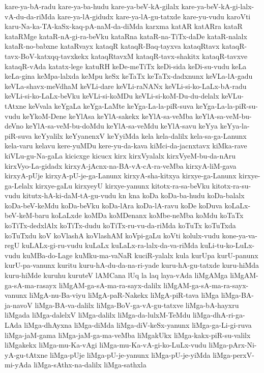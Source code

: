 {kare-ya-bA-radu
kare-ya-ba-hudu
kare-ya-beV-kA-gilalx
kare-ya-beV-kA-gi-lalx-vA-du-da-riMda
kare-ya-lA-gidudx
kare-ya-lA-gu-tatxde
kare-yu-vudu
karoVti
karu-Na-ka-TA-kaSx-kaq-pA-naM-da-diMda
karxma
katAR
katARra
kataR
kataRMge
kataR-nA-gi-ra-beVku
kataRna
kataR-na-TiTx-daDe
kataR-nalalx
kataR-no-babxne
kataRvayx
kataqR
kataqR-Baq-tayxva
kataqRtavx
kataqR-tavx-BoV-katxqq-tavxkekx
kataqRtavxM
kataqR-tavx-shakitx
kataqR-tavxve
kataqR-vAda
katatx-lege
katuRH
keDe-meTiTx
keDi-sida
keDi-su-vudu
keLa
keLa-gina
keMpa-lalxda
keMpu
keSx
keTaTx
keTaTx-dadxnunx
keVLa-lA-gadu
keVLa-shavx-meVdhaM
keVLi-dare
keVLi-raNANx
keVLi-si-ko-LaLx-bA-radu
keVLi-si-ko-LaLx-beVku
keVLi-si-koMDu
keVLi-si-koM-Du-du-delalx
keVLu-tAtxne
keVvala
keYgaLa
keYga-LaMte
keYga-La-la-piR-suva
keYga-La-la-piR-su-vudu
keYkoM-Dene
keYlAsa
keYlA-sakekx
keYlA-sa-veMba
keYlA-sa-veM-bu-deVno
keYlA-sa-veM-bu-doMdu
keYlA-sa-veMdu
keYlA-savu
keYya
keYya-la-piR-suva
keYyalilx
keYyanenxV
keYyiMda
kela
kela-dalilx
kela-sa-ga-Lanunx
kela-varu
kelavu
kere-yuMDu
kere-yu-da-kava
kiMci-da-jacnxtavx
kiMka-rave
kiVLu-gu-Na-gaLa
kicicxge
kicucx
kirx
kirxVyalalx
kirxVyeM-bu-da-nAru
kirxVyo-La-gidadx
kirxyA-jAcnx-na-BA-vA-cA-ra-veMba
kirxyA-liM-gava
kirxyA-pUje
kirxyA-pU-je-ga-Lanunx
kirxyA-sha-kitxya
kirxye-ga-Lanunx
kirxye-ga-Lelalx
kirxye-gaLu
kirxyeyU
kirxye-yanunx
kitotx-ra-sa-beVku
kitotx-ra-su-vudu
kitutx-hA-ki-daM-tA-gu-vudu
kn
kna
koDa
koDa-ba-hudu
koDa-balalx
koDa-beV-keMdu
koDa-beVku
koDa-lAra
koDa-lA-ravu
koDe
koDuva
koLaLx-beV-keM-baru
koLaLxde
koMDa
koMDenanx
koMbe-neMba
koMdu
koTaTx
koTiTx-dedxlAlx
koTiTx-dudu
koTiTx-ru-vu-da-riMda
koTuTx
koTuTxda
koTuTxdu
koV
koVlashA
koVlashAM
koVpi-gaLu
koVti
kolulx-vudu
kone-ya-va-regU
kuLALx-gi-ru-vudu
kuLaLx
kuLaLx-ra-lalx-da-va-riMda
kuLi-tu-ko-LuLx-vudu
kuMBa-do-Lage
kuMku-ma-vaNaR
kuciR-yalalx
kula
kurUpa
kurU-panunx
kurU-pa-vanunx
kuritu
kuru-hA-du-da-na-ri-yade
kuru-hA-gu-tatxde
kuru-hiMda
kuru-hiMde
kuruhu
kuruteV
lAMCana
lUq
la
laq
laya-vAda
liMgAMga
liMgAM-ga-sA-ma-rasayx
liMgAM-ga-sA-ma-ra-sayx-dalilx
liMgAM-ga-sA-ma-ra-sayx-vanunx
liMgA-nu-Ba-viyu
liMgA-paR-Nakekx
liMgA-piR-tava
liMga
liMga-BA-ja-navoV
liMga-BA-va-dalilx
liMga-BoV-ga-vA-gu-tatxve
liMga-bA-hayxru
liMgada
liMga-dalelxV
liMga-dalilx
liMga-da-lulxM-TeMdu
liMga-dhA-ri-ga-LAda
liMga-dhAyxna
liMga-diMda
liMga-diV-keSx-yanunx
liMga-ga-Li-gi-ruva
liMga-jaM-gama
liMga-jaM-ga-ma-veMba
liMgakUkx
liMga-kakx-piR-su-valilx
liMgakekx
liMga-mu-Ka-vAgi
liMga-mu-Ka-vA-gi-ko-LuLx-vudu
liMga-pArx-Ni-yA-gu-tAtxne
liMga-pUje
liMga-pU-je-yanunx
liMga-pU-je-yiMda
liMga-perxV-mi-yAda
liMga-sAthx-na-dalilx
liMga-sathxla
}
